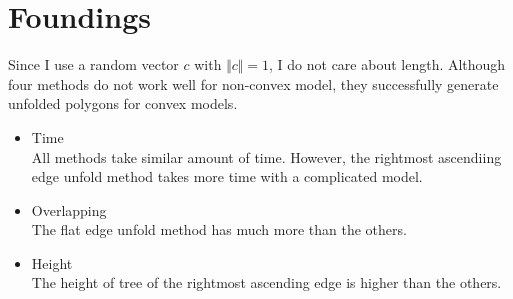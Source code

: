 \documentclass[11pt, letterpaper]{article}
\begin{document}
\section{Foundings}
Since I use a random vector $c$ with $\Vert c \Vert = 1$, I do not care about length. Although four methods do not work well for non-convex model, they successfully generate unfolded polygons for convex models. 
\begin{itemize}
	\item{Time}
	\\All methods take similar amount of time. However, the rightmost ascendiing edge unfold method takes more time with a complicated model.
	\item{Overlapping}
	\\The flat edge unfold method has much more than the others.
	\item{Height}
	\\The height of tree of the rightmost ascending edge is higher than the others.
\end{itemize}



\end{document}
